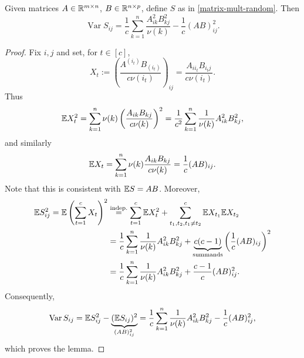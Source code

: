 \begin{lemma} \label{lemma:var-appro-prod}
\begin{mdframed}
Given matrices $A\in \mathbb{R}^{m \times n}$, $B\in \mathbb{R}^{n\times p}$, define $S$ as in \eqref{matrix-mult-random}. Then
\begin{equation}
\operatorname{Var} S_{ij} = \frac{1}{c} \sum_{k=1}^n \frac{A_{ik}^2 B_{kj}^2}{\nu(k)} - \frac{1}{c} (AB)_{ij}^2.
\end{equation}
\end{mdframed}
\begin{proof}
Fix $i,j$ and set, for $t\in [c]$,
\begin{equation*}
X_t := \left(
\frac{A^{(i_t)}B_{(i_t)}}{c\nu(i_t)}
\right)_{ij} = \frac{A_{i i_t}B_{i_t j}}{c\nu(i_t)}.
\end{equation*}
Thus
\begin{equation*}
\mathbb{E} X_t^2 = \sum_{k=1}^n \nu(k) \left(
\frac{A_{ik}B_{kj}}{c\nu(k)}
\right)^2 = \frac{1}{c^2}\sum_{k=1}^n \frac{1}{\nu(k)}A^2_{ik}B^2_{kj},
\end{equation*}
and similarly
\begin{equation*}
\mathbb{E} X_t = \sum_{k=1}^n \nu(k) \frac{A_{ik}B_{kj}}{c \nu(k)}= \frac{1}{c} (AB)_{ij}.
\end{equation*}
Note that this is consistent with $\mathbb{E} S= AB$. Moreover,
\begin{equation*}
\begin{split}
\mathbb{E} S_{ij}^2 = \mathbb{E} \left( \sum_{t=1}^c X_t \right)^2 & \overset{\text{indep.}}{=} \sum_{t=1}^c \mathbb{E} X_t^2 + \sum_{t_1,t_2, t_1 \neq t_2}^c \mathbb{E} X_{t_1} \mathbb{E} X_{t_2} \\
& = \frac{1}{c}\sum_{k=1}^n \frac{1}{\nu(k)} A_{ik}^2 B_{kj}^2 + \underbrace{c(c-1)}_{\text{summands}} \left(\frac{1}{c}(AB)_{ij}\right)^2 \\
& =  \frac{1}{c}\sum_{k=1}^n \frac{1}{\nu(k)} A_{ik}^2 B_{kj}^2 + \frac{c-1}{c} (AB)_{ij}^2.
\end{split}
\end{equation*}
Consequently,
\begin{equation*}
\operatorname{Var}S_{ij} = \mathbb{E} S_{ij}^2 - \underbrace{(\mathbb{E} S_{ij})^2}_{(AB)_{ij}^2} =  \frac{1}{c}\sum_{k=1}^n \frac{1}{\nu(k)} A_{ik}^2 B_{kj}^2 - \frac{1}{c} (AB)_{ij}^2,
\end{equation*}
which proves the lemma.
\end{proof}
\end{lemma}
